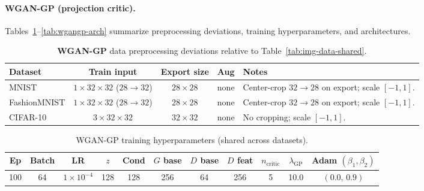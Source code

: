 \paragraph{WGAN-GP (projection critic).}
Tables~\ref{tab:wgangp-data}--\ref{tab:wgangp-arch} summarize preprocessing deviations, training
hyperparameters, and architectures.

\begin{table}[H]
\centering
\scriptsize
\caption{\textbf{WGAN-GP} data preprocessing deviations relative to Table~\ref{tab:img-data-shared}.}
\label{tab:wgangp-data}
\begin{adjustbox}{max width=\linewidth}
\begin{tabularx}{\linewidth}{@{}lcccX@{}}
\toprule
Dataset & Train input & Export size & Aug & Notes \\
\midrule
MNIST        & $1{\times}32{\times}32$ ($28\!\to\!32$) & $28{\times}28$ & none & Center-crop $32\!\to\!28$ on export; scale $[-1,1]$. \\
FashionMNIST & $1{\times}32{\times}32$ ($28\!\to\!32$) & $28{\times}28$ & none & Center-crop $32\!\to\!28$ on export; scale $[-1,1]$. \\
CIFAR-10     & $3{\times}32{\times}32$                  & $32{\times}32$ & none & No cropping; scale $[-1,1]$. \\
\bottomrule
\end{tabularx}
\end{adjustbox}
\end{table}

\begin{table}[H]
\centering
\scriptsize
\caption{WGAN-GP training hyperparameters (shared across datasets).}
\label{tab:wgangp-hparams}
\begin{adjustbox}{max width=\linewidth}
\begin{tabular}{@{}ccccccccccc@{}}
\toprule
Ep & Batch & LR & $z$ & Cond & $G$ base & $D$ base & $D$ feat & $n_{\text{critic}}$ & $\lambda_{\text{GP}}$ & Adam $(\beta_1,\beta_2)$ \\
\midrule
100 & 64 & $1{\times}10^{-4}$ & 128 & 128 & 256 & 64 & 256 & 5 & 10.0 & $(0.0,\,0.9)$ \\
\bottomrule
\end{tabular}
\end{adjustbox}
\end{table}

